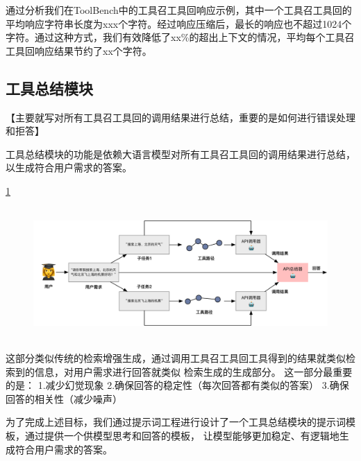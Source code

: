 通过分析我们在ToolBench中的工具召工具回响应示例，其中一个工具召工具回的平均响应字符串长度为xxx个字符。经过响应压缩后，最长的响应也不超过1024个字符。通过这种方式，我们有效降低了xx\%的超出上下文的情况，平均每个工具召工具回响应结果节约了xx个字符。

\subsection{工具总结模块}

【主要就写对所有工具召工具回的调用结果进行总结，重要的是如何进行错误处理和拒答】

工具总结模块的功能是依赖大语言模型对所有工具召工具回的调用结果进行总结，以生成符合用户需求的答案。

\ref{fig:ch4-summary}

\begin{figure}[!htp]
  \vspace{1em}
  \centering
  \setlength{\abovecaptionskip}{10pt} %
  \includegraphics[height=5cm]{../assets/ch4-工具总结模块.pdf}
  \label{fig:ch4-summary}
\end{figure}


这部分类似传统的检索增强生成，通过调用工具召工具回工具得到的结果就类似检索到的信息，对用户需求进行回答就类似
检索生成的生成部分。
这一部分最重要的是：
1.减少幻觉现象
2.确保回答的稳定性（每次回答都有类似的答案）
3.确保回答的相关性（减少噪声）

为了完成上述目标，我们通过提示词工程进行设计了一个工具总结模块的提示词模板，通过提供一个供模型思考和回答的模板，
让模型能够更加稳定、有逻辑地生成符合用户需求的答案。



